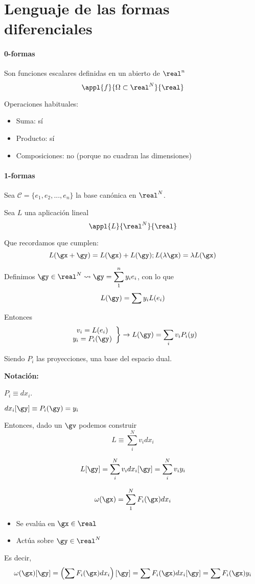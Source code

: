 \section{Lenguaje de las formas diferenciales}

\paragraph{0-formas}

Son funciones escalares definidas en un abierto de $\real^n$
\[\appl{f}{\Omega\subset\real^N}{\real}\]

Operaciones habituales:
\begin{itemize}
\item Suma: sí
\item Producto: sí
\item Composiciones: no (porque no cuadran las dimensiones)
\end{itemize}

\paragraph{1-formas}

Sea $\mathcal{C} = \{e_1,e_2,...,e_n\}$ la base canónica en $\real^N$.

Sea $L$ una aplicación lineal
\[\appl{L}{\real^N}{\real}\]

Que recordamos que cumplen:
\[ L(\gx+\gy) = L(\gx)+L(\gy); L(\lambda\gx) = \lambda L(\gx)\]

Definimos $\gy\in\real^N \leadsto \gy = \displaystyle\sum_1^n y_i e_i$, con lo que \[L(\gy) = \sum y_i L(e_i)\]

Entonces \[\left.\begin{array}{cc}
v_i = L(e_i)\\
y_i = P_i(\gy)
\end{array}\right\} \rightarrow L(\gy) = \sum_i v_iP_i(y)\]

Siendo $P_i$ las proyecciones, una base del espacio dual.

\textbf{Notación:}

$P_i \equiv dx_i$.

$dx_i[\gy] \equiv P_i(\gy) = y_i$

Entonces, dado un $\gv$ podemos construir 
\[L \equiv \sum_i^N v_idx_i\]

\[L[\gy] = \sum_i^N v_idx_i[\gy] = \sum_i^N v_iy_i\]

\begin{defn}[1-forma]
\[\omega(\gx)= \sum_1^N F_i(\gx) dx_i\]

\begin{itemize}
\item Se evalúa en $\gx\in\real$
\item Actúa sobre $\gy\in\real^N$ 
\end{itemize}

Es decir, \[\omega(\gx)[\gy] = \left(\sum F_i(\gx)dx_i\right)[\gy] = \sum F_i(\gx)dx_i[\gy] = \sum F_i(\gx)y_i\]
\end{defn}

